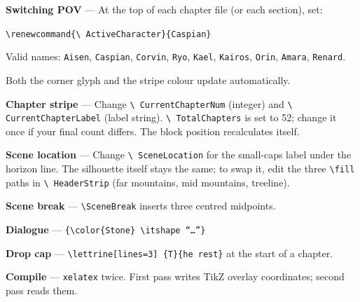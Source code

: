 \documentclass[12pt, a4paper, twoside, openright]{book}
\begin{document}
{\color{InkMid}\fontsize{10}{16}\selectfont

\textbf{Switching POV} --- At the top of each chapter file (or each
section), set:

\vspace{4pt}\texttt{\textbackslash renewcommand\{\textbackslash
ActiveCharacter\}\{Caspian\}}

Valid names: \texttt{Aisen}, \texttt{Caspian}, \texttt{Corvin},
\texttt{Ryo}, \texttt{Kael}, \texttt{Kairos}, \texttt{Orin},
\texttt{Amara}, \texttt{Renard}.

Both the corner glyph and the stripe colour update automatically.

\vspace{8pt}
\textbf{Chapter stripe} --- Change \texttt{\textbackslash
CurrentChapterNum} (integer) and \texttt{\textbackslash
CurrentChapterLabel} (label string). \texttt{\textbackslash
TotalChapters} is set to 52; change it once if your final count
differs. The block position recalculates itself.

\vspace{8pt}
\textbf{Scene location} --- Change \texttt{\textbackslash
SceneLocation} for the small-caps label under the horizon line.
The silhouette itself stays the same; to swap it, edit the three
\texttt{\textbackslash fill} paths in \texttt{\textbackslash
HeaderStrip} (far mountains, mid mountains, treeline).

\vspace{8pt}
\textbf{Scene break} --- \texttt{\textbackslash SceneBreak} inserts
three centred midpoints.

\vspace{8pt}
\textbf{Dialogue} --- \texttt{\{\textbackslash color\{Stone\}%
\textbackslash itshape ``\ldots''\}}

\vspace{8pt}
\textbf{Drop cap} --- \texttt{\textbackslash lettrine[lines=3]%
\{T\}\{he rest\}} at the start of a chapter.

\vspace{8pt}
\textbf{Compile} --- \texttt{xelatex} twice. First pass writes
TikZ overlay coordinates; second pass reads them.
}
\end{document}
